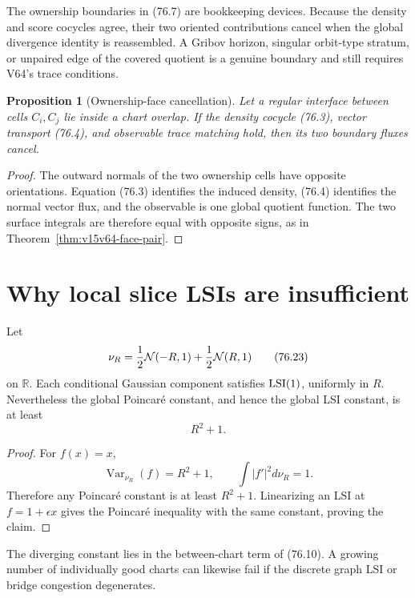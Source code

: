 \documentclass[11pt]{article}
\newtheorem{proposition}[theorem]{Proposition}
\theoremstyle{remark}
\begin{document}
The ownership boundaries in (76.7) are bookkeeping devices.
Because the density and score cocycles agree, their two oriented
contributions cancel when the global divergence identity is
reassembled.  A Gribov horizon, singular orbit-type stratum, or
unpaired edge of the covered quotient is a genuine boundary and
still requires V64's trace conditions.

\begin{proposition}[Ownership-face cancellation]
\label{prop:v15v76-ownership}
Let a regular interface between cells \(C_i,C_j\) lie inside a
chart overlap.  If the density cocycle (76.3), vector transport
(76.4), and observable trace matching hold, then its two boundary
fluxes cancel.
\end{proposition}

\begin{proof}
The outward normals of the two ownership cells have opposite
orientations.  Equation (76.3) identifies the induced density,
(76.4) identifies the normal vector flux, and the observable is one
global quotient function.  The two surface integrals are therefore
equal with opposite signs, as in
Theorem~\ref{thm:v15v64-face-pair}.
\end{proof}

\section{Why local slice LSIs are insufficient}

\begin{counterexample}
\label{cnt:v15v76-mixture}
Let
\[
 \nu_R=\frac12{\cal N}(-R,1)+\frac12{\cal N}(R,1)     \tag{76.23}
\]
on \(\mathbb R\).  Each conditional Gaussian component satisfies
\({\rm LSI}(1)\), uniformly in \(R\).  Nevertheless the global
Poincar\'e constant, and hence the global LSI constant, is at least
\[
 R^2+1.                                               \tag{76.24}
\]
\end{counterexample}

\begin{proof}
For \(f(x)=x\),
\[
 \operatorname{Var}_{\nu_R}(f)=R^2+1,\qquad
 \int|f'|^2d\nu_R=1.
\]
Therefore any Poincar\'e constant is at least \(R^2+1\).
Linearizing an LSI at \(f=1+\epsilon x\) gives the Poincar\'e
inequality with the same constant, proving the claim.
\end{proof}

The diverging constant lies in the between-chart term of (76.10).
A growing number of individually good charts can likewise fail if
the discrete graph LSI or bridge congestion degenerates.
\end{document}
